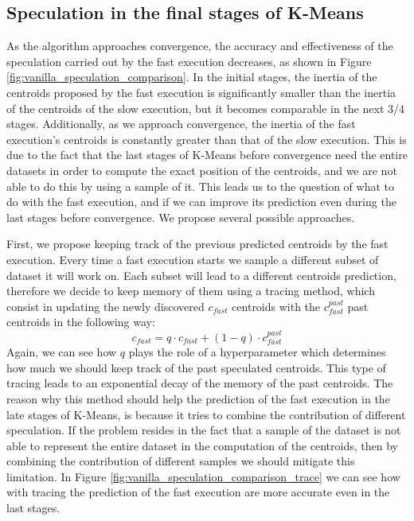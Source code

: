 \subsection{Speculation in the final stages of K-Means}
As the algorithm approaches convergence, the accuracy and effectiveness of the speculation carried out by the fast execution decreases, as shown in Figure \ref{fig:vanilla_speculation_comparison}. In the initial stages, the inertia of the centroids proposed by the fast execution is significantly smaller than the inertia of the centroids of the slow execution, but it becomes comparable in the next 3/4 stages. Additionally, as we approach convergence, the inertia of the fast execution's centroids is constantly greater than that of the slow execution.
This is due to the fact that the last stages of K-Means before convergence need the entire datasets in order to compute the exact position of the centroids, and we are not able to do this by using a sample of it.
This leads us to the question of what to do with the fast execution, and if we can improve its prediction even during the last stages before convergence.
We propose several possible approaches.

First, we propose keeping track of the previous predicted centroids by the fast execution. Every time a fast execution starts we sample a different subset of dataset it will work on.
Each subset will lead to a different centroids prediction, therefore we decide to keep memory of them using a tracing method, which consist in updating the newly discovered $c_{fast}$ centroids with the $c_{fast}^{past}$ past centroids in the following way:
\begin{equation}
c_{fast} = q \cdot c_{fast} + (1-q) \cdot c_{fast}^{past}
\end{equation}
Again, we can see how $q$ plays the role of a hyperparameter which determines how much we should keep track of the past speculated centroids.
This type of tracing leads to an exponential decay of the memory of the past centroids.
The reason why this method should help the prediction of the fast execution in the late stages of K-Means, is because it tries to combine the contribution of different speculation. If the problem resides in the fact that a sample of the dataset is not able to represent the entire dataset in the computation of the centroids, then by combining the contribution of different samples we should mitigate this limitation. In Figure \ref{fig:vanilla_speculation_comparison_trace} we can see how with tracing the prediction of the fast execution are more accurate even in the last stages.

